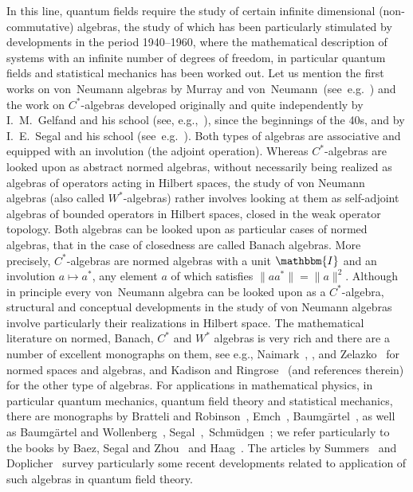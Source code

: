 \documentclass[11pt]{article}
\newcommand{\asterisk}{\mathord{*}}
\begin{document}
In this line, quantum fields require the study of certain infinite dimensional
(non-commutative) algebras, the study of which has been particularly
stimulated by developments in the period 1940--1960, where the mathematical
description of systems with an infinite number of degrees of freedom, in
particular quantum fields and statistical mechanics has been worked out. Let
us mention the first works on von~Neumann algebras by Murray and
von~Neumann~(see~e.g.~{\cite{VonNeumann}}) and the work on
$C^{\asterisk}$-algebras developed originally and quite independently by
I.~M.~Gelfand and his school (see, e.g.,~{\cite{Gelfand}}), since the
beginnings of the 40s, and by I.~E.~Segal and his school
(see~e.g.~{\cite{Segal1,Segalbook}}). Both types of algebras are associative
and equipped with an involution (the adjoint operation). Whereas
$C^{\ast}$-algebras are looked upon as abstract normed algebras, without
necessarily being realized as algebras of operators acting in Hilbert spaces,
the study of von Neumann algebras (also called $W^{\ast}$-algebras) rather
involves looking at them as self-adjoint algebras of bounded operators in
Hilbert spaces, closed in the weak operator topology. Both algebras can be
looked upon as particular cases of normed algebras, that in the case of
closedness are called Banach algebras. More precisely, $C^{\ast}$-algebras are
normed algebras with a unit $\mathbbm{I}$ and an involution $a \mapsto
a^{\ast}$, any element $a$ of which satisfies $\| a a^{\ast} \| = \| a \|^2$.
Although in principle every von~Neumann algebra can be looked upon as a
$C^{\ast}$-algebra, structural and conceptual developments in the study of von
Neumann algebras involve particularly their realizations in Hilbert space. The
mathematical literature on normed, Banach, $C^{\ast}$ and $W^{\ast}$ algebras
is very rich and there are a number of excellent monographs on them, see e.g.,
Naimark~{\cite{Naimark}}, {\cite{bonsall_complete_1973}}, and
Zelazko~{\cite{MR0448079}} for normed spaces and algebras, and Kadison and
Ringrose~{\cite{Kadison1,Kadison2}} (and references therein) for the other
type of algebras. For applications in mathematical physics, in particular
quantum mechanics, quantum field theory and statistical mechanics, there are
monographs by Bratteli and Robinson~{\cite{Bratteli1,Bratteli2}},
Emch~{\cite{Emch}}, Baumg{\"a}rtel~{\cite{Baumgartel1}}, as well as
Baumg{\"a}rtel and Wollenberg~{\cite{Baumgartel2}},
Segal~{\cite{Segalbook2}},~Schm{\"u}dgen~{\cite{schmudgen_unbounded_1990}}; we
refer particularly to the books by Baez, Segal and Zhou~{\cite{Segalbook}} and
Haag~{\cite{Haag1}}. The articles by Summers~{\cite{summers2012perspective}}
and Doplicher~{\cite{Doplicher}} survey particularly some recent developments
related to application of such algebras in quantum field theory.
\end{document}
